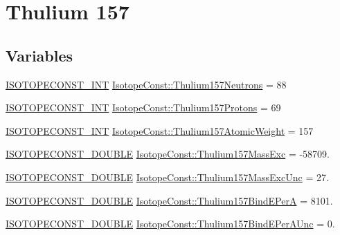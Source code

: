 \hypertarget{group___isotope_const-_thulium-_tm157}{}\section{Thulium 157}
\label{group___isotope_const-_thulium-_tm157}
\subsection*{Variables}
\begin{DoxyCompactItemize}
\item 
\mbox{\hyperlink{group___isotope_const-_macros_ga5f18360b3e99483a35c32d789e62621c}{I\+S\+O\+T\+O\+P\+E\+C\+O\+N\+S\+T\+\_\+\+I\+NT}} \mbox{\hyperlink{group___isotope_const-_thulium-_tm157_ga1b7328431cacd23927c484afe566a022}{Isotope\+Const\+::\+Thulium157\+Neutrons}} = 88
\item 
\mbox{\hyperlink{group___isotope_const-_macros_ga5f18360b3e99483a35c32d789e62621c}{I\+S\+O\+T\+O\+P\+E\+C\+O\+N\+S\+T\+\_\+\+I\+NT}} \mbox{\hyperlink{group___isotope_const-_thulium-_tm157_ga09bd11a92ea4394a13c98ca9961426b8}{Isotope\+Const\+::\+Thulium157\+Protons}} = 69
\item 
\mbox{\hyperlink{group___isotope_const-_macros_ga5f18360b3e99483a35c32d789e62621c}{I\+S\+O\+T\+O\+P\+E\+C\+O\+N\+S\+T\+\_\+\+I\+NT}} \mbox{\hyperlink{group___isotope_const-_thulium-_tm157_ga497f34130dcb61a1179345b8efc9a036}{Isotope\+Const\+::\+Thulium157\+Atomic\+Weight}} = 157
\item 
\mbox{\hyperlink{group___isotope_const-_macros_ga8f45a7272ce02c0b4c65c44636ed719a}{I\+S\+O\+T\+O\+P\+E\+C\+O\+N\+S\+T\+\_\+\+D\+O\+U\+B\+LE}} \mbox{\hyperlink{group___isotope_const-_thulium-_tm157_gac60b687154fbd0f56e9c3fe76c85d6c4}{Isotope\+Const\+::\+Thulium157\+Mass\+Exc}} = -\/58709.
\item 
\mbox{\hyperlink{group___isotope_const-_macros_ga8f45a7272ce02c0b4c65c44636ed719a}{I\+S\+O\+T\+O\+P\+E\+C\+O\+N\+S\+T\+\_\+\+D\+O\+U\+B\+LE}} \mbox{\hyperlink{group___isotope_const-_thulium-_tm157_gaae4160f50c4c9dc6e599a294d1397510}{Isotope\+Const\+::\+Thulium157\+Mass\+Exc\+Unc}} = 27.
\item 
\mbox{\hyperlink{group___isotope_const-_macros_ga8f45a7272ce02c0b4c65c44636ed719a}{I\+S\+O\+T\+O\+P\+E\+C\+O\+N\+S\+T\+\_\+\+D\+O\+U\+B\+LE}} \mbox{\hyperlink{group___isotope_const-_thulium-_tm157_ga5b520e090b261278a5d2d7bc851477e2}{Isotope\+Const\+::\+Thulium157\+Bind\+E\+PerA}} = 8101.
\item 
\mbox{\hyperlink{group___isotope_const-_macros_ga8f45a7272ce02c0b4c65c44636ed719a}{I\+S\+O\+T\+O\+P\+E\+C\+O\+N\+S\+T\+\_\+\+D\+O\+U\+B\+LE}} \mbox{\hyperlink{group___isotope_const-_thulium-_tm157_ga36fb02914740a28eb50f4d9472d139d9}{Isotope\+Const\+::\+Thulium157\+Bind\+E\+Per\+A\+Unc}} = 0.

\end{DoxyCompactItemize}
